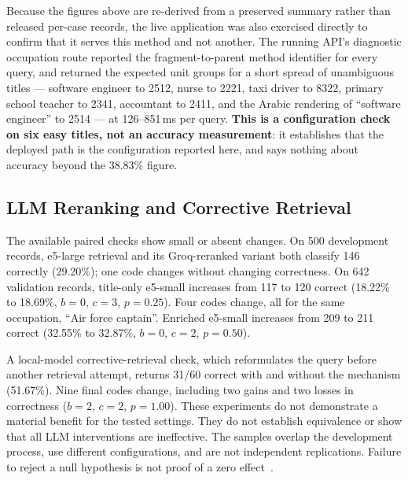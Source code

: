 Because the figures above are re-derived from a preserved summary rather
than released per-case records, the live application was also exercised
directly to confirm that it serves this method and not another. The running
API's diagnostic occupation route reported the fragment-to-parent method
identifier for every query, and returned the expected unit groups for a
short spread of unambiguous titles --- software engineer to 2512, nurse to
2221, taxi driver to 8322, primary school teacher to 2341, accountant to
2411, and the Arabic rendering of ``software engineer'' to 2514 --- at
126--851\,ms per query. \textbf{This is a configuration check on six easy
titles, not an accuracy measurement}: it establishes that the deployed path
is the configuration reported here, and says nothing about accuracy beyond
the 38.83\% figure.

\subsection{LLM Reranking and Corrective Retrieval}

The available paired checks show small or absent changes. On 500 development
records, e5-large retrieval and its Groq-reranked variant both classify
146 correctly (29.20\%); one code changes without changing correctness.
On 642 validation records, title-only e5-small increases from 117 to
120 correct (18.22\% to 18.69\%, $b=0$, $c=3$, $p=0.25$). Four codes
change, all for the same occupation, ``Air force captain''. Enriched
e5-small increases from 209 to 211 correct (32.55\% to 32.87\%,
$b=0$, $c=2$, $p=0.50$).

A local-model corrective-retrieval check, which reformulates the query
before another retrieval attempt, returns 31/60 correct with and without
the mechanism (51.67\%). Nine final codes change, including two gains and
two losses in correctness ($b=2$, $c=2$, $p=1.00$). These experiments
do not demonstrate a material benefit for the tested settings. They do
not establish equivalence or show that all LLM interventions are ineffective.
The samples overlap the development process, use different configurations,
and are not independent replications. Failure to reject a null hypothesis
is not proof of a zero effect~\cite{wasserstein2016}.

